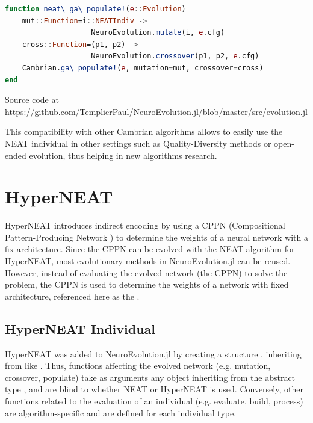 \begin{minipage}{\linewidth}
\begin{lstlisting}[language=Julia, caption=Genetic Algorithm populate for NEAT]
function neat\_ga\_populate!(e::Evolution)
    mut::Function=i::NEATIndiv -> 
                    NeuroEvolution.mutate(i, e.cfg)
    cross::Function=(p1, p2) -> 
                    NeuroEvolution.crossover(p1, p2, e.cfg)
    Cambrian.ga\_populate!(e, mutation=mut, crossover=cross)
end
\end{lstlisting}
Source code at \url{https://github.com/TemplierPaul/NeuroEvolution.jl/blob/master/src/evolution.jl}\\
\end{minipage}

This compatibility with other Cambrian algorithms allows to easily use the NEAT individual in other settings such as Quality-Diversity methods or open-ended evolution, thus helping in new algorithms research.

\section{HyperNEAT}
HyperNEAT \cite{HyperNEAT} introduces indirect encoding by using a CPPN (Compositional Pattern-Producing Network \cite{CPPN}) to determine the weights of a neural network with a fix architecture. Since the CPPN can be evolved with the NEAT algorithm for HyperNEAT, most evolutionary methods in NeuroEvolution.jl can be reused. \\ 
However, instead of evaluating the evolved network (the CPPN) to solve the problem, the CPPN is used to determine the weights of a network with fixed architecture, referenced here as the . 

\subsection{HyperNEAT Individual}

HyperNEAT was added to NeuroEvolution.jl by creating a structure , inheriting from  like . Thus, functions affecting the evolved network (e.g. mutation, crossover, populate) take as arguments any object inheriting from the abstract type , and are blind to whether NEAT or HyperNEAT is used. Conversely, other functions related to the evaluation of an individual (e.g. evaluate, build, process) are algorithm-specific and are defined for each individual type.

